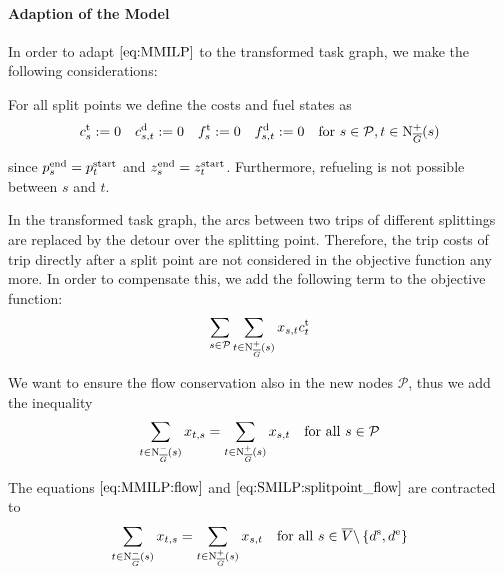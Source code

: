 \paragraph{Adaption of the Model} \parfill

In order to adapt $\eqref{eq:MMILP}$ to the transformed task graph, we make the following considerations:

For all split points we define the costs and fuel states as
\begin{align*}
	c^{\operatorname{t}}_s := 0 && c^{\operatorname{d}}_{s,t} := 0 && f^{\operatorname{t}}_s := 0 && f^{\operatorname{d}}_{s,t} := 0 && \text{for } s\in \mathcal{P},t\in\operatorname{N}_{\overline{G}}^+(s)
\end{align*}

since $p^{\operatorname{end}}_s = p^{\operatorname{start}}_t$ and $z^{\operatorname{end}}_s = z^{\operatorname{start}}_t$. Furthermore, refueling is not possible between $s$ and $t$.

In the transformed task graph, the arcs between two trips of different splittings are replaced by the detour over the splitting point. Therefore, the trip costs of trip directly after a split point are not considered in the objective function any more. In order to compensate this, we add the following term to the objective function:
\begin{align*}
	\sum_{s\in \mathcal{P}}\sum_{t\in\operatorname{N}_{\overline{G}}^+(s)}x_{s,t}c^{\operatorname{t}}_t
\end{align*}

We want to ensure the flow conservation also in the new nodes $\mathcal{P}$, thus we add the inequality
\begin{align}
	\sum_{t\in\operatorname{N}_{\overline{G}}^-(s)} x_{t,s} = \sum_{t\in\operatorname{N}_{\overline{G}}^+(s)} x_{s,t} & & \text{for all } s\in\mathcal{P} \label{eq:SMILP:splitpoint_flow}
\end{align}

The equations $\eqref{eq:MMILP:flow}$ and $\eqref{eq:SMILP:splitpoint_flow}$ are contracted to
\begin{align}
	\sum_{t\in\operatorname{N}_{\overline{G}}^-(s)} x_{t,s} = \sum_{t\in\operatorname{N}_{\overline{G}}^+(s)} x_{s,t} & & \text{for all } s\in \overline{V}\backslash\left\{d^{\operatorname{s}},d^{\operatorname{e}}\right\} \label{eq:SMILP:flow}
\end{align}

\newpage

